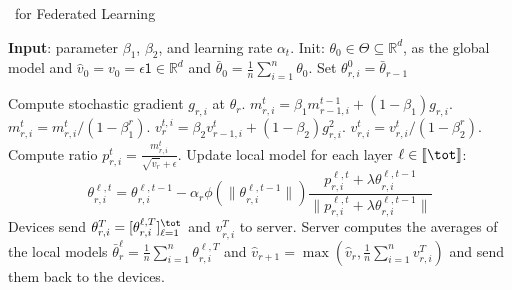 \documentclass{article}
\begin{document}
\begin{algorithm}[H]
\caption{\algo\ for Federated Learning} \label{alg:ldams}
\begin{algorithmic}[1]
\STATE \textbf{Input}: parameter $\beta_1$, $\beta_2$, and learning rate $\alpha_t$. 
\STATE Init: $\theta_{0} \in \Theta \subseteq \mathbb R^d $, as the global model and $\hat v_0=v_{0} = \epsilon \mathsf{1} \in \mathbb R^{d}$ and $\bar{\theta}_0 =  \frac{1}{n} \sum_{i=1}^n \theta_0$.
\STATE Set $\theta_{r,i}^{0} = \bar{\theta}_{r-1}$

\STATE Compute stochastic gradient $g_{r,i}$ at $\theta_r$.
\STATE $m^t_{r,i} = \beta_1 m^{t-1}_{r-1,i} + (1 - \beta_1) g_{r,i}$. \label{line:first}
\STATE $m^{t}_{r,i}=m^{t}_{r,i} /\left(1-\beta_{1}^{r}\right)$. \label{line:new1}
\STATE $v^{t,i}_r = \beta_2 v^{t}_{r-1,i} + (1 - \beta_2) g_{r,i}^2$. \label{line:second}
\STATE $v^{t}_{r,i}=v^{t}_{r,i} /\left(1-\beta_{2}^{r}\right)$. \label{line:new2}
\STATE Compute ratio  $p_{r,i}^t=\frac{m^{t}_{r,i}}{\sqrt{\hat v_{r}}+\epsilon}$. \label{line:scale}
\STATE Update local model for each layer $\ell \in \llbracket \tot \rrbracket$: \label{line:layer}
$$\theta_{r,i}^{\ell,t}=\theta_{r,i}^{\ell,t-1}-\alpha_{r} \phi(\|\theta_{r,i}^{\ell,t-1}\|)\frac{p_{r,i}^{\ell,t}+\lambda \theta_{r,i}^{\ell,t-1}}{ \|p_{r,i}^{\ell,t}+\lambda \theta_{r,i}^{\ell,t-1}\|}$$
\ENDFOR
\STATE Devices send $\theta_{r,i}^{T} = [\theta_{r,i}^{\ell,T}]_{\ell =1}^{\tot}$ and $v_{r,i}^T$ to server.
\ENDFOR
\STATE Server computes the averages of the local models $\bar{\theta}_r^\ell = \frac{1}{n} \sum_{i=1}^n \theta_{r,i}^{\ell,T}$ and $\hat{v}_{r+1} = \max( \hat{v}_{r},\frac{1}{n} \sum_{i=1}^n v^T_{r,i} )$ and send them back to the devices. \label{line:final}
\ENDFOR
\end{algorithmic}
\end{algorithm}
\end{document}
